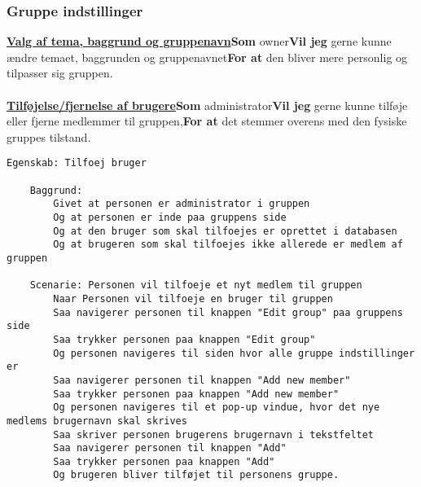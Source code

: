 \subsubsection{Gruppe indstillinger}

\textbf{\underline{Valg af tema, baggrund og gruppenavn}}\newline \textbf{Som} owner\newline \textbf{Vil jeg} gerne kunne ændre temaet, baggrunden og gruppenavnet\newline \textbf{For at} den bliver mere personlig og tilpasser sig gruppen. \\\\

\noindent\textbf{\underline{Tilføjelse/fjernelse af brugere}}\newline \textbf{Som} administrator\newline \textbf{Vil jeg} gerne kunne tilføje eller fjerne medlemmer til gruppen,\newline \textbf{For at} det stemmer overens med den fysiske gruppes tilstand. 

\begin{lstlisting}[language=Gherkin]
Egenskab: Tilfoej bruger

    Baggrund:
        Givet at personen er administrator i gruppen
        Og at personen er inde paa gruppens side
        Og at den bruger som skal tilfoejes er oprettet i databasen
        Og at brugeren som skal tilfoejes ikke allerede er medlem af gruppen
        
    Scenarie: Personen vil tilfoeje et nyt medlem til gruppen
        Naar Personen vil tilfoeje en bruger til gruppen
        Saa navigerer personen til knappen "Edit group" paa gruppens side
        Saa trykker personen paa knappen "Edit group"
        Og personen navigeres til siden hvor alle gruppe indstillinger er
        Saa navigerer personen til knappen "Add new member"
        Saa trykker personen paa knappen "Add new member"
        Og personen navigeres til et pop-up vindue, hvor det nye medlems brugernavn skal skrives
        Saa skriver personen brugerens brugernavn i tekstfeltet
        Saa navigerer personen til knappen "Add"
        Saa trykker personen paa knappen "Add"
        Og brugeren bliver tilføjet til personens gruppe.

\end{lstlisting}


